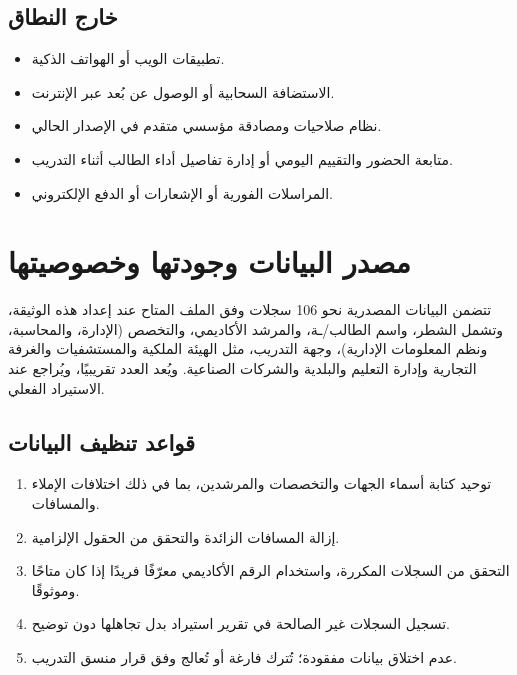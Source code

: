 \documentclass[12pt,a4paper]{article}
\begin{document}
\subsection{خارج النطاق}
\begin{itemize}
\item تطبيقات الويب أو الهواتف الذكية.
\item الاستضافة السحابية أو الوصول عن بُعد عبر الإنترنت.
\item نظام صلاحيات ومصادقة مؤسسي متقدم في الإصدار الحالي.
\item متابعة الحضور والتقييم اليومي أو إدارة تفاصيل أداء الطالب أثناء التدريب.
\item المراسلات الفورية أو الإشعارات أو الدفع الإلكتروني.
\end{itemize}

\section{مصدر البيانات وجودتها وخصوصيتها}
تتضمن البيانات المصدرية نحو 106 سجلات وفق الملف المتاح عند إعداد هذه الوثيقة، وتشمل الشطر، واسم الطالب/ـة، والمرشد الأكاديمي، والتخصص (الإدارة، والمحاسبة، ونظم المعلومات الإدارية)، وجهة التدريب، مثل الهيئة الملكية والمستشفيات والغرفة التجارية وإدارة التعليم والبلدية والشركات الصناعية. ويُعد العدد تقريبيًا، ويُراجع عند الاستيراد الفعلي.

\subsection{قواعد تنظيف البيانات}
\begin{enumerate}
\item توحيد كتابة أسماء الجهات والتخصصات والمرشدين، بما في ذلك اختلافات الإملاء والمسافات.
\item إزالة المسافات الزائدة والتحقق من الحقول الإلزامية.
\item التحقق من السجلات المكررة، واستخدام الرقم الأكاديمي معرّفًا فريدًا إذا كان متاحًا وموثوقًا.
\item تسجيل السجلات غير الصالحة في تقرير استيراد بدل تجاهلها دون توضيح.
\item عدم اختلاق بيانات مفقودة؛ تُترك فارغة أو تُعالج وفق قرار منسق التدريب.
\end{enumerate}
\end{document}
